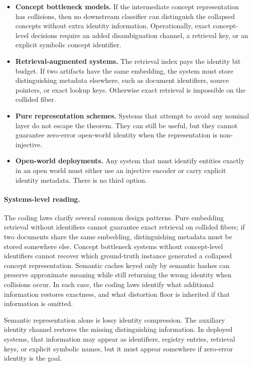 \begin{itemize}
\item \textbf{Concept bottleneck models.} If the intermediate concept representation has collisions, then no downstream classifier can distinguish the collapsed concepts without extra identity information. Operationally, exact concept-level decisions require an added disambiguation channel, a retrieval key, or an explicit symbolic concept identifier.

\item \textbf{Retrieval-augmented systems.} The retrieval index pays the identity bit budget. If two artifacts have the same embedding, the system must store distinguishing metadata elsewhere, such as document identifiers, source pointers, or exact lookup keys. Otherwise exact retrieval is impossible on the collided fiber.

\item \textbf{Pure representation schemes.} Systems that attempt to avoid any nominal layer do not escape the theorem. They can still be useful, but they cannot guarantee zero-error open-world identity when the representation is non-injective.

\item \textbf{Open-world deployments.} Any system that must identify entities exactly in an open world must either use an injective encoder or carry explicit identity metadata. There is no third option.
\end{itemize}

\paragraph{Systems-level reading.}
The coding laws clarify several common design patterns. Pure embedding retrieval without identifiers cannot guarantee exact retrieval on collided fibers; if two documents share the same embedding, distinguishing metadata must be stored somewhere else. Concept bottleneck systems without concept-level identifiers cannot recover which ground-truth instance generated a collapsed concept representation. Semantic caches keyed only by semantic hashes can preserve approximate meaning while still returning the wrong identity when collisions occur. In each case, the coding laws identify what additional information restores exactness, and what distortion floor is inherited if that information is omitted.

Semantic representation alone is lossy identity compression. The auxiliary identity channel restores the missing distinguishing information. In deployed systems, that information may appear as identifiers, registry entries, retrieval keys, or explicit symbolic names, but it must appear somewhere if zero-error identity is the goal.


